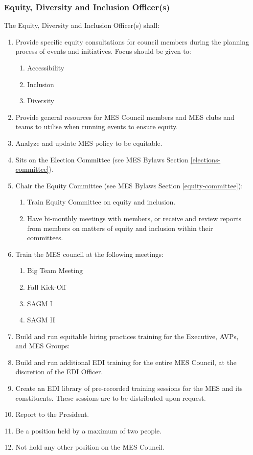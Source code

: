 \subsubsection{Equity, Diversity and Inclusion
 Officer(s)}
\label{equity-diversity-and-inclusion-officers}
The Equity, Diversity and Inclusion Officer(s) shall:

\begin{enumerate}
 \item
  Provide specific equity consultations for council members during the
  planning process of events and initiatives. Focus should be given to:

  \begin{enumerate}
   \item
    Accessibility
   \item
    Inclusion
   \item
    Diversity
  \end{enumerate}
 \item
  Provide general resources for MES Council members and MES clubs and
  teams to utilise when running events to ensure equity.
 \item
  Analyze and update MES policy to be equitable.
 \item
  Sits on the Election Committee (see MES Bylaws Section
  \ref{elections-committee}).
 \item
  Chair the Equity Committee (see MES Bylaws Section
  \ref{equity-committee}):

  \begin{enumerate}
   \item
    Train Equity Committee on equity and inclusion.
   \item
    Have bi-monthly meetings with members, or receive and review reports
    from members on matters of equity and inclusion within their
    committees.
  \end{enumerate}
 \item
  Train the MES council at the following meetings:

  \begin{enumerate}
   \item
    Big Team Meeting
   \item
    Fall Kick-Off
   \item
    SAGM I
   \item
    SAGM II
  \end{enumerate}
 \item
  Build and run equitable hiring practices training for the Executive,
  AVPs, and MES Groups:
 \item
  Build and run additional EDI training for the entire MES Council, at
  the discretion of the EDI Officer.
 \item
  Create an EDI library of pre-recorded training sessions for the MES
  and its constituents. These sessions are to be distributed upon
  request.
 \item
  Report to the President.
 \item
  Be a position held by a maximum of two people.
 \item
  Not hold any other position on the MES Council.

\end{enumerate}

